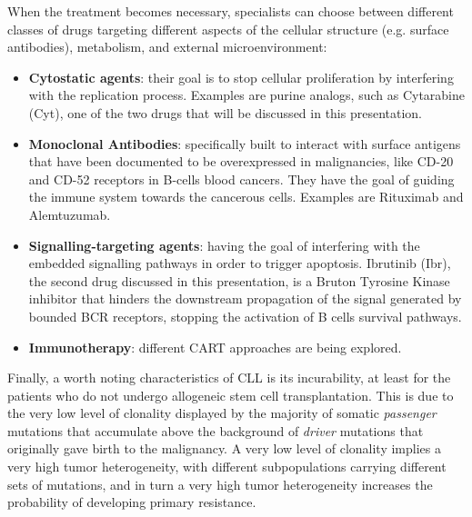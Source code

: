 When the treatment becomes necessary, specialists can choose between different classes of drugs targeting different aspects of the cellular structure (e.g. surface antibodies), metabolism, and external microenvironment:
\begin{itemize}
	\item \textbf{Cytostatic agents}: their goal is to stop cellular proliferation by interfering with the replication process. Examples are purine analogs, such as Cytarabine (Cyt), one of the two drugs that will be discussed in this presentation.
	\item \textbf{Monoclonal Antibodies}: specifically built to interact with surface antigens that have been documented to be overexpressed in malignancies, like CD-20 and CD-52 receptors in B-cells blood cancers. They have the goal of guiding the immune system towards the cancerous cells. Examples are Rituximab and Alemtuzumab.
	\item \textbf{Signalling-targeting agents}: having the goal of interfering with the embedded signalling pathways in order to trigger apoptosis. Ibrutinib (Ibr), the second drug discussed in this presentation, is a Bruton Tyrosine Kinase inhibitor that hinders the downstream propagation of the signal generated by bounded BCR receptors, stopping the activation of B cells survival pathways. 
	\item \textbf{Immunotherapy}: different CART approaches are being explored.
\end{itemize} \par
\vspace{0.4cm}
Finally, a worth noting characteristics of CLL is its incurability, at least for the patients who do not undergo allogeneic stem cell transplantation. This is due to the very low level of clonality displayed by the majority of somatic \textit{passenger} mutations that accumulate above the background of \textit{driver} mutations that originally gave birth to the malignancy. A very low level of clonality implies a very high tumor heterogeneity, with different subpopulations carrying different sets of mutations, and in turn a very high tumor heterogeneity increases the probability of developing primary resistance. \par


